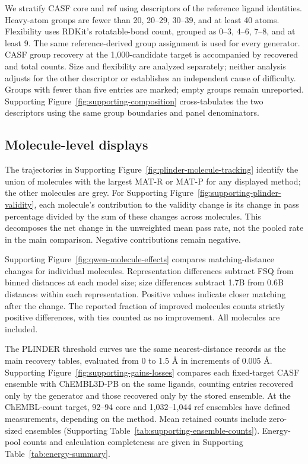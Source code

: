 We stratify CASF core and ref using descriptors of the reference ligand identities.
Heavy-atom groups are fewer than 20, 20--29, 30--39, and at least 40 atoms. Flexibility
uses RDKit's rotatable-bond count, grouped as 0--3, 4--6, 7--8, and at least 9. The same
reference-derived group assignment is used for every generator. CASF group recovery at the
1,000-candidate target is accompanied by recovered and total counts. Size and flexibility
are analyzed separately; neither analysis adjusts for the other descriptor or establishes an
independent cause of difficulty. Groups with fewer than five entries are marked;
empty groups remain unreported. Supporting Figure~\ref{fig:supporting-composition} cross-tabulates the two
descriptors using the same group boundaries and panel denominators.

\subsection*{Molecule-level displays}

The trajectories in Supporting Figure~\ref{fig:plinder-molecule-tracking} identify the union of
molecules with the largest MAT-R or MAT-P for any displayed method; the other
molecules are grey. For Supporting Figure~\ref{fig:supporting-plinder-validity}, each molecule's contribution to the
validity change is its change in pass percentage divided by the sum of these changes
across molecules. This decomposes the net change in the unweighted mean pass rate,
not the pooled rate in the main comparison. Negative contributions remain negative.

Supporting Figure~\ref{fig:qwen-molecule-effects} compares matching-distance changes for individual molecules.
Representation differences subtract FSQ from binned distances at each model size;
size differences subtract 1.7B from 0.6B distances within each representation.
Positive values indicate closer matching after the change. The reported fraction
of improved molecules counts strictly positive differences, with ties counted as
no improvement. All molecules are included.

The PLINDER threshold curves use the same nearest-distance records as the main
recovery tables, evaluated from 0 to 1.5 \AA{} in increments of 0.005 \AA{}.
Supporting Figure~\ref{fig:supporting-gains-losses} compares each fixed-target CASF ensemble with ChEMBL3D-PB on
the same ligands, counting entries recovered only by the generator and those recovered
only by the stored ensemble. At the ChEMBL-count target, 92--94 core and
1,032--1,044 ref ensembles have defined measurements, depending on the method.
Mean retained counts include zero-sized ensembles (Supporting Table~\ref{tab:supporting-ensemble-counts}).
Energy-pool counts and calculation completeness are given in Supporting Table~\ref{tab:energy-summary}.

